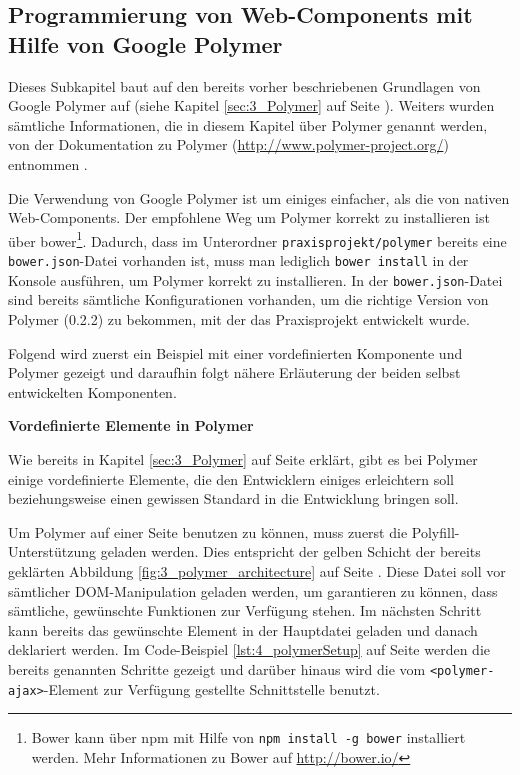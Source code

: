 \subsection{Programmierung von Web-Components mit Hilfe von Google Polymer}
\label{sec:4_WC_Polymer}

Dieses Subkapitel baut auf den bereits vorher beschriebenen Grundlagen von Google Polymer auf (siehe Kapitel \ref{sec:3_Polymer} auf Seite \pageref{sec:3_Polymer}). Weiters wurden sämtliche Informationen, die in diesem Kapitel über Polymer genannt werden, von der Dokumentation zu Polymer (\url{http://www.polymer-project.org/}) entnommen \citereset \autocite{Polymer}.

Die Verwendung von Google Polymer ist um einiges einfacher, als die von nativen Web-Components. Der empfohlene Weg um Polymer korrekt zu installieren ist über \glqq bower\footnote{Bower kann über npm mit Hilfe von \lstinline|npm install -g bower| installiert werden. Mehr Informationen zu Bower auf \href{http://bower.io/}{http://bower.io/}}\grqq . Dadurch, dass im Unterordner \lstinline|praxisprojekt/polymer| bereits eine \lstinline|bower.json|-Datei vorhanden ist, muss man lediglich \lstinline|bower install| in der Konsole ausführen, um Polymer korrekt zu installieren. In der \lstinline|bower.json|-Datei sind bereits sämtliche Konfigurationen vorhanden, um die richtige Version von Polymer (0.2.2) zu bekommen, mit der das Praxisprojekt entwickelt wurde.

Folgend wird zuerst ein Beispiel mit einer vordefinierten Komponente und Polymer gezeigt und daraufhin folgt nähere Erläuterung der beiden selbst entwickelten Komponenten.

\textbf{Vordefinierte Elemente in Polymer}

Wie bereits in Kapitel \ref{sec:3_Polymer} auf Seite \pageref{sec:3_Polymer} erklärt, gibt es bei Polymer einige vordefinierte Elemente, die den Entwicklern einiges erleichtern soll beziehungsweise einen gewissen Standard in die Entwicklung bringen soll.

Um Polymer auf einer Seite benutzen zu können, muss zuerst die Polyfill-Unterstützung geladen werden. Dies entspricht der gelben Schicht der bereits geklärten Abbildung \ref{fig:3_polymer_architecture} auf Seite \pageref{fig:3_polymer_architecture}.
Diese Datei soll vor sämtlicher DOM-Manipulation geladen werden, um garantieren zu können, dass sämtliche, gewünschte Funktionen zur Verfügung stehen. Im nächsten Schritt kann bereits das gewünschte Element in der Hauptdatei geladen und danach deklariert werden. Im Code-Beispiel \ref{lst:4_polymerSetup} auf Seite \pageref{lst:4_polymerSetup} werden die bereits genannten Schritte gezeigt und darüber hinaus wird die vom \lstinline|<polymer-ajax>|-Element zur Verfügung gestellte Schnittstelle benutzt.

